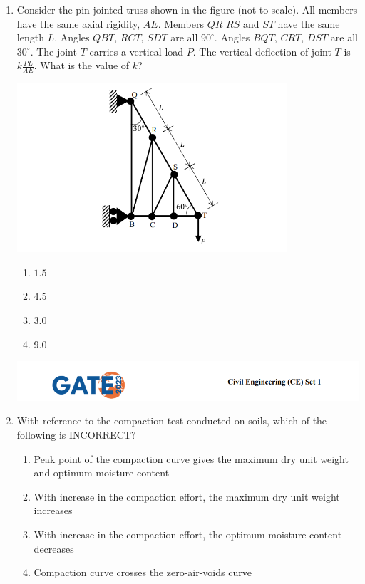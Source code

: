 \documentclass[journal,14pt,onecolumn]{IEEEtran}
\theoremstyle{remark}
\begin{document}
\begin{enumerate}[label={Q\arabic*.}]
\item Consider the pin-jointed truss shown in the figure (not to scale). All members have the same axial rigidity, $AE$. Members $QR$
$RS$ and $ST$ have the same length $L$. Angles $QBT$, $RCT$, $SDT$ are all $90^\circ$. Angles $BQT$, $CRT$, $DST$ are all $30^\circ$. The joint $T$ carries a vertical load $P$. The vertical deflection of joint $T$ is $k\frac{PL}{AE}$. What is the value of $k$?
\begin{center}
    \includegraphics[width=10cm]{pics/Screenshot 2025-08-05 211110.png}
\end{center}
\begin{enumerate}
    \item $1.5$
    \item $4.5$
    \item $3.0$
    \item $9.0$
\end{enumerate}

\newpage

\includegraphics[width=\textwidth]{pics/header.png}
\item With reference to the compaction test conducted on soils, which of the following is INCORRECT?
\begin{enumerate}
    \item Peak point of the compaction curve gives the maximum dry unit weight and optimum moisture content
    \item With increase in the compaction effort, the maximum dry unit weight increases
    \item With increase in the compaction effort, the optimum moisture content decreases
    \item Compaction curve crosses the zero-air-voids curve
\end{enumerate}
\vspace{1cm}


\end{enumerate}
\end{document}
